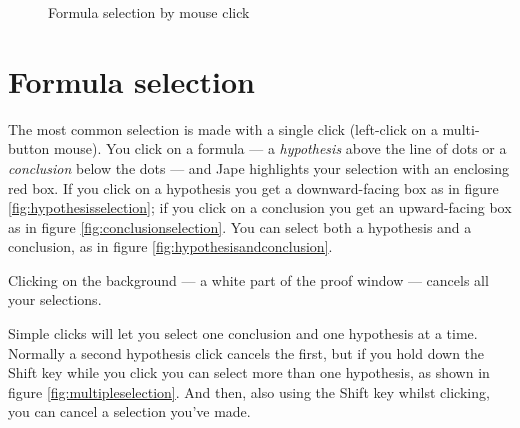 \documentclass[11pt]{book}
\newcommand{\figref}[1]{figure \ref{fig:#1}}
\begin{document}
\begin{figure}
\quad
{}
\caption{Formula selection by mouse click}
\end{figure}

\section{Formula selection}
\label{sec:formulaselection}

The most common selection is made with a single click (left-click on a multi-button mouse). You click on a formula --- a \emph{hypothesis} above the line of dots or a \emph{conclusion} below the dots --- and Jape highlights your selection with an enclosing red box. If you click on a hypothesis you get a downward-facing box as in \figref{hypothesisselection}; if you click on a conclusion you get an upward-facing box as in \figref{conclusionselection}. You can select both a hypothesis and a conclusion, as in \figref{hypothesisandconclusion}.

Clicking on the background --- a white part of the proof window --- cancels all your selections.

Simple clicks will let you select one conclusion and one hypothesis at a time. Normally a second hypothesis click cancels the first, but if you hold down the Shift key while you click you can select more than one hypothesis, as shown in \figref{multipleselection}. And then, also using the Shift key whilst clicking, you can cancel a selection you've made.
\end{document}
